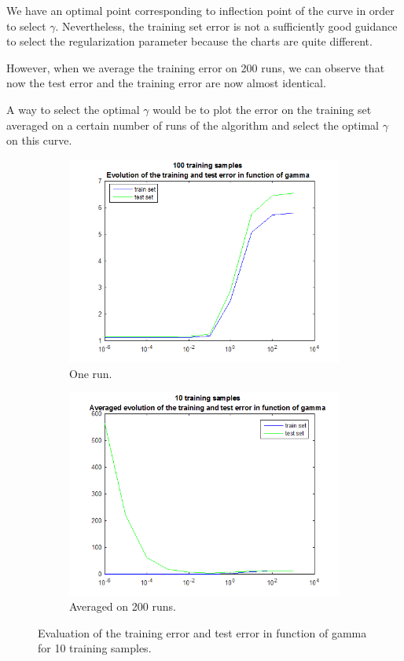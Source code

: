 \documentclass{article} %
\begin{document}
We have an optimal point corresponding to inflection point of the curve in order to select $\gamma$. Nevertheless, the training set error is not a sufficiently good guidance to select the regularization parameter because the charts are quite different. 

However, when we average the training error on 200 runs, we can observe that now the test error and the training error are now almost identical.

A way to select the optimal $\gamma$ would be to plot the error on the training set averaged on a certain number of runs of the algorithm and select the optimal $\gamma$ on this curve. 


 \begin{figure}[h]
\center
 \begin{subfigure}[b]{0.45\textwidth}
        \includegraphics[width=\textwidth]{4_100}
        \caption{One run.}
    \end{subfigure}
    \begin{subfigure}[b]{0.45\textwidth}
        \includegraphics[width=\textwidth]{4_10_avg}
        \caption{Averaged on 200 runs.}
    \end{subfigure}
    \caption{Evaluation of the training error and test error in function of gamma for 10 training samples.}
    \label{fig:ex4_10}
\end{figure}
\end{document}
